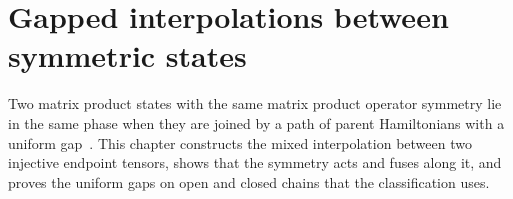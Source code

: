 \chapter{Gapped interpolations between symmetric states}
\label{ch:mpo_interpolation}

Two matrix product states with the same matrix product operator symmetry lie in
the same phase when they are joined by a path of parent Hamiltonians with a
uniform gap~\cite{GarreRubio2023MPOSym}. This chapter constructs the mixed
interpolation between two injective endpoint tensors, shows that the symmetry
acts and fuses along it, and proves the uniform gaps on open and closed chains
that the classification uses.


























